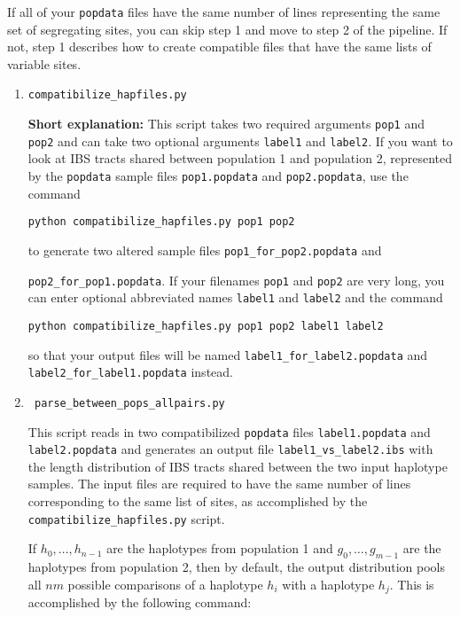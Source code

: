 \documentclass[12pt]{article}
\begin{document}
If all of your \verb|popdata| files have the same number of lines representing the same set of segregating sites, you can skip step 1 and move to step 2 of the pipeline. If not, step 1 describes how to create compatible files that have the same lists of variable sites. 

\begin{enumerate}
\item \verb|compatibilize_hapfiles.py|

\textbf{Short explanation:} This script takes two required arguments \texttt{pop1} and \texttt{pop2} and can take two optional arguments \texttt{label1} and \texttt{label2}. If you want to look at IBS tracts shared between population 1 and population 2, represented by the \texttt{popdata} sample files  \texttt{pop1.popdata} and \texttt{pop2.popdata}, use the command

\begin{verbatim}
python compatibilize_hapfiles.py pop1 pop2
\end{verbatim} 

to generate two altered sample files  \verb|pop1_for_pop2.popdata| and 

\verb|pop2_for_pop1.popdata|.
If your filenames \texttt{pop1} and \texttt{pop2} are very long, you can enter optional abbreviated names \texttt{label1} and \texttt{label2} and the command

\begin{verbatim}
python compatibilize_hapfiles.py pop1 pop2 label1 label2
\end{verbatim} 

so that your output files will be named \verb|label1_for_label2.popdata| and \verb|label2_for_label1.popdata| instead.

\item \verb| parse_between_pops_allpairs.py |

This script reads in two compatibilized \texttt{popdata} files  \verb|label1.popdata| and \verb|label2.popdata| and generates an output file \verb|label1_vs_label2.ibs| with the length distribution of IBS tracts shared between the two input haplotype samples. The input files are required to have the same number of lines corresponding to the same list of sites, as accomplished by the \verb|compatibilize_hapfiles.py| script. 

If $h_0,\ldots,h_{n-1}$ are the haplotypes from population 1 and $g_0,\ldots,g_{m-1}$ are the haplotypes from population 2, then by default, the output distribution pools all $nm$ possible comparisons of a haplotype $h_i$ with a haplotype $h_j$. This is accomplished by the following command:


\end{enumerate}
\end{document}
